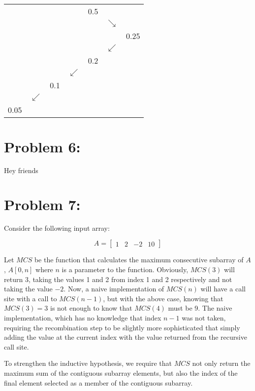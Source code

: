 \documentclass[12pt]{article}
\begin{document}
\begin{table}[H]
\centering
\label{my-label}
\begin{tabular}{lllllll}
     &  &     &  & 0.5 &  &      \\
     &  &     &  &     & {$\searrow$} &      \\
     &  &     &  &     &  & 0.25 \\
     &  &     &  &     & {$\swarrow$} &      \\
     &  &     &  & 0.2 &  &      \\
     &  &     & {$\swarrow$} &     &  &      \\
     &  & 0.1 &  &     &  &      \\
     & {$\swarrow$} &     &  &     &  &      \\
0.05 &  &     &  &     &  &     
\end{tabular}
\end{table}
\section*{Problem 6: }
Hey friends
\section*{Problem 7: }

Consider the following input array:

\[
A =
  \begin{bmatrix}
    1 & 2 & -2 & 10
  \end{bmatrix}
\]

Let $MCS$ be the function that calculates the maximum consecutive subarray of $A$, $A[0, n]$ where $n$ is a parameter to the function. Obviously, $MCS(3)$ will return $3$, taking the values 1 and 2 from index 1 and 2 respectively and not taking the value $-2$. Now, a naive implementation of $MCS(n)$ will have a call site with a call to $MCS(n-1)$, but with the above case, knowing that $MCS(3) = 3$ is not enough to know that $MCS(4)$ must be 9. The naive implementation, which has no knowledge that index $n-1$ was not taken, requiring the recombination step to be slightly more sophisticated that simply adding the value at the current index with the value returned from the recursive call site.

To strengthen the inductive hypothesis, we require that $MCS$ not only return the maximum sum of the contiguous subarray elements, but also the index of the final element selected as a member of the contiguous subarray.
\end{document}
